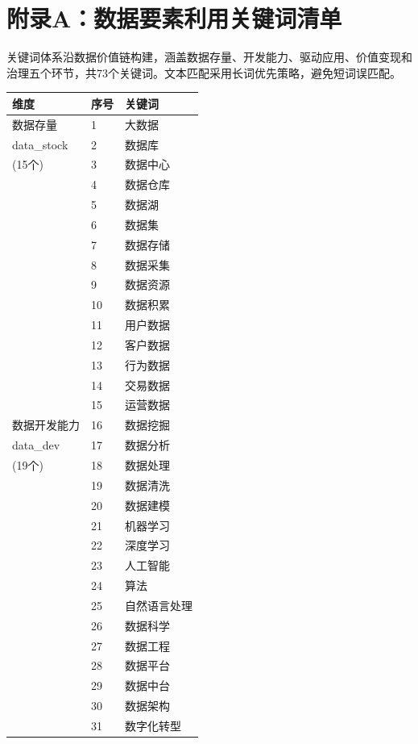 \section{附录A：数据要素利用关键词清单}\label{ux9644ux5f55aux6570ux636eux8981ux7d20ux5229ux7528ux5173ux952eux8bcdux6e05ux5355}

关键词体系沿数据价值链构建，涵盖数据存量、开发能力、驱动应用、价值变现和治理五个环节，共73个关键词。文本匹配采用长词优先策略，避免短词误匹配。

{\def\LTcaptype{} %
\begin{longtable}[]{@{}lll@{}}
\toprule\noalign{}
维度 & 序号 & 关键词 \\
\midrule\noalign{}
\endhead
\bottomrule\noalign{}
\endlastfoot
数据存量 & 1 & 大数据 \\
data\_stock & 2 & 数据库 \\
(15个) & 3 & 数据中心 \\
& 4 & 数据仓库 \\
& 5 & 数据湖 \\
& 6 & 数据集 \\
& 7 & 数据存储 \\
& 8 & 数据采集 \\
& 9 & 数据资源 \\
& 10 & 数据积累 \\
& 11 & 用户数据 \\
& 12 & 客户数据 \\
& 13 & 行为数据 \\
& 14 & 交易数据 \\
& 15 & 运营数据 \\
数据开发能力 & 16 & 数据挖掘 \\
data\_dev & 17 & 数据分析 \\
(19个) & 18 & 数据处理 \\
& 19 & 数据清洗 \\
& 20 & 数据建模 \\
& 21 & 机器学习 \\
& 22 & 深度学习 \\
& 23 & 人工智能 \\
& 24 & 算法 \\
& 25 & 自然语言处理 \\
& 26 & 数据科学 \\
& 27 & 数据工程 \\
& 28 & 数据平台 \\
& 29 & 数据中台 \\
& 30 & 数据架构 \\
& 31 & 数字化转型 \\

\end{longtable}}
